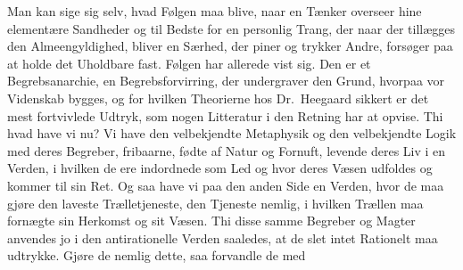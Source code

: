 Man kan sige sig selv, hvad Følgen maa blive, naar en Tænker overseer
hine elementære Sandheder og til Bedste for en personlig Trang, der naar der
tillægges den Almeengyldighed, bliver en Særhed, der piner og trykker Andre,
forsøger paa at holde det Uholdbare fast. Følgen har allerede vist sig. Den er
et Begrebsanarchie, en Begrebsforvirring, der undergraver den Grund, hvorpaa
vor Videnskab bygges, og for hvilken Theorierne hos Dr.\ Heegaard sikkert er
det mest fortvivlede Udtryk, som nogen Litteratur i den Retning har at opvise.
Thi hvad have vi nu? Vi have den velbekjendte Metaphysik og den velbekjendte
Logik med deres Begreber, fribaarne, fødte af Natur og Fornuft, levende deres
Liv i en Verden, i hvilken de ere indordnede som Led og hvor deres Væsen
udfoldes og kommer til sin Ret.
Og saa have vi paa den anden Side en Verden, hvor de maa gjøre den laveste
Trælletjeneste, den Tjeneste nemlig, i hvilken Trællen maa fornægte sin
Herkomst og sit Væsen. Thi disse samme Begreber og Magter anvendes jo i den
antirationelle Verden saaledes, at de slet intet
Rationelt maa udtrykke. Gjøre de nemlig dette, saa forvandle de med
